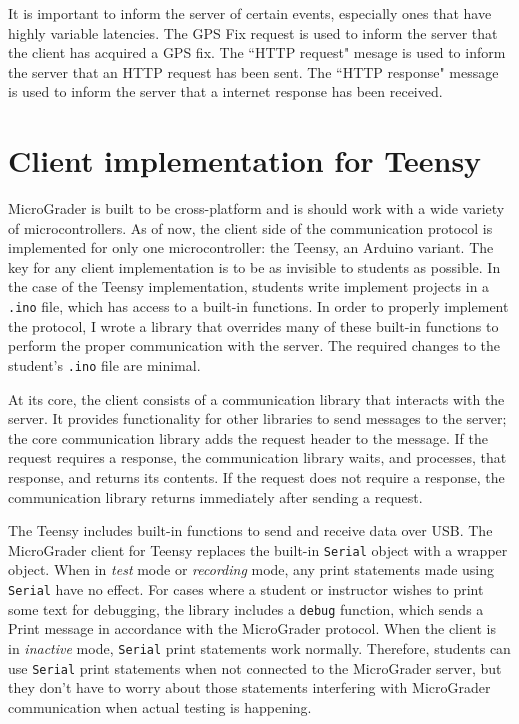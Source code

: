 \documentclass[12pt]{article}
\begin{document}
\begin{appendices}
It is important to inform the server of certain events, especially ones that have highly variable latencies.  The GPS Fix request is used to inform the server that the client has acquired a GPS fix.  The ``HTTP request" mesage is used to inform the server that an HTTP request has been sent.  The ``HTTP response" message is used to inform the server that a internet response has been received.

\newpage
\section{Client implementation for Teensy}
\label{sec:teensy}
MicroGrader is built to be cross-platform and is should work with a wide variety of microcontrollers.  As of now, the client side of the communication protocol is implemented for only one microcontroller: the Teensy, an Arduino variant.  The key for any client implementation is to be as invisible to students as possible.  In the case of the Teensy implementation, students write implement projects in a \texttt{.ino} file, which has access to a built-in functions.  In order to properly implement the protocol, I wrote a library that overrides many of these built-in functions to perform the proper communication with the server.  The required changes to the student's \texttt{.ino} file are minimal.

At its core, the client consists of a communication library that interacts with the server.  It provides functionality for other libraries to send messages to the server; the core communication library adds the request header to the message.  If the request requires a response, the communication library waits, and processes, that response, and returns its contents.  If the request does not require a response, the communication library returns immediately after sending a request.

The Teensy includes built-in functions to send and receive data over USB.  The MicroGrader client for Teensy replaces the built-in \texttt{Serial} object with a wrapper object.  When in \textit{test} mode or \textit{recording} mode, any print statements made using \texttt{Serial} have no effect.  For cases where a student or instructor wishes to print some text for debugging, the library includes a \texttt{debug} function, which sends a Print message in accordance with the MicroGrader protocol.  When the client is in \textit{inactive} mode, \texttt{Serial} print statements work normally.  Therefore, students can use \texttt{Serial} print statements when not connected to the MicroGrader server, but they don't have to worry about those statements interfering with MicroGrader communication when actual testing is happening.


\end{appendices}
\end{document}
